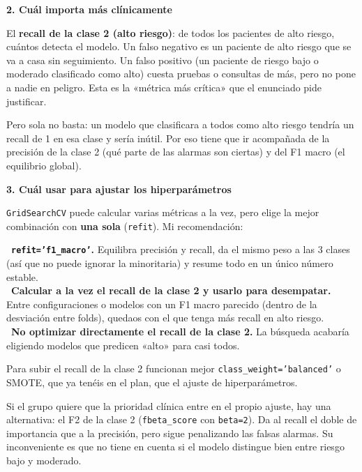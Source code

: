 \documentclass[11pt,a4paper]{article}
\begin{document}
{\textbf{2. Cuál importa más clínicamente}

El \textbf{recall de la clase 2 (alto riesgo)}: de todos los pacientes de alto riesgo, cuántos detecta el modelo. Un falso negativo es un paciente de alto riesgo que se va a casa sin seguimiento. Un falso positivo (un paciente de riesgo bajo o moderado clasificado como alto) cuesta pruebas o consultas de más, pero no pone a nadie en peligro. Esta es la «métrica más crítica» que el enunciado pide justificar.

Pero sola no basta: un modelo que clasificara a todos como alto riesgo tendría un recall de 1 en esa clase y sería inútil. Por eso tiene que ir acompañada de la precisión de la clase 2 (qué parte de las alarmas son ciertas) y del F1 macro (el equilibrio global).

\textbf{3. Cuál usar para ajustar los hiperparámetros}

\texttt{GridSearchCV} puede calcular varias métricas a la vez, pero elige la mejor combinación con \textbf{una sola} (\texttt{refit}). Mi recomendación:

\hspace*{1.0em}\textbullet~\textbf{\texttt{refit='f1\_\allowbreak{}macro'}.} Equilibra precisión y recall, da el mismo peso a las 3 clases (así que no puede ignorar la minoritaria) y resume todo en un único número estable. \\{}
\hspace*{1.0em}\textbullet~\textbf{Calcular a la vez el recall de la clase 2 y usarlo para desempatar.} Entre configuraciones o modelos con un F1 macro parecido (dentro de la desviación entre folds), quedaos con el que tenga más recall en alto riesgo. \\{}
\hspace*{1.0em}\textbullet~\textbf{No optimizar directamente el recall de la clase 2.} La búsqueda acabaría eligiendo modelos que predicen «alto» para casi todos.

Para subir el recall de la clase 2 funcionan mejor \texttt{class\_\allowbreak{}weight='balanced'} o SMOTE, que ya tenéis en el plan, que el ajuste de hiperparámetros.

Si el grupo quiere que la prioridad clínica entre en el propio ajuste, hay una alternativa: el F2 de la clase 2 (\texttt{fbeta\_\allowbreak{}score} con \texttt{beta=2}). Da al recall el doble de importancia que a la precisión, pero sigue penalizando las falsas alarmas. Su inconveniente es que no tiene en cuenta si el modelo distingue bien entre riesgo bajo y moderado.

}
\end{document}
